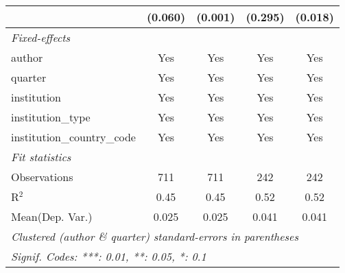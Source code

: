 \begin{tabular}{lcccc}
                                            & (0.060) & (0.001) & (0.295)   & (0.018)\\   
   \midrule
   \emph{Fixed-effects}\\
   author                                   & Yes     & Yes     & Yes       & Yes\\  
   quarter                                  & Yes     & Yes     & Yes       & Yes\\  
   institution                              & Yes     & Yes     & Yes       & Yes\\  
   institution\_type                        & Yes     & Yes     & Yes       & Yes\\  
   institution\_country\_code               & Yes     & Yes     & Yes       & Yes\\  
   \midrule
   \emph{Fit statistics}\\
   Observations                             & 711     & 711     & 242       & 242\\  
   R$^2$                                    & 0.45    & 0.45    & 0.52      & 0.52\\  
Mean(Dep. Var.) & 0.025 & 0.025 & 0.041 & 0.041 \\
   \midrule \midrule
   \multicolumn{5}{l}{\emph{Clustered (author \& quarter) standard-errors in parentheses}}\\
   \multicolumn{5}{l}{\emph{Signif. Codes: ***: 0.01, **: 0.05, *: 0.1}}\\
\end{tabular}
\par\endgroup
